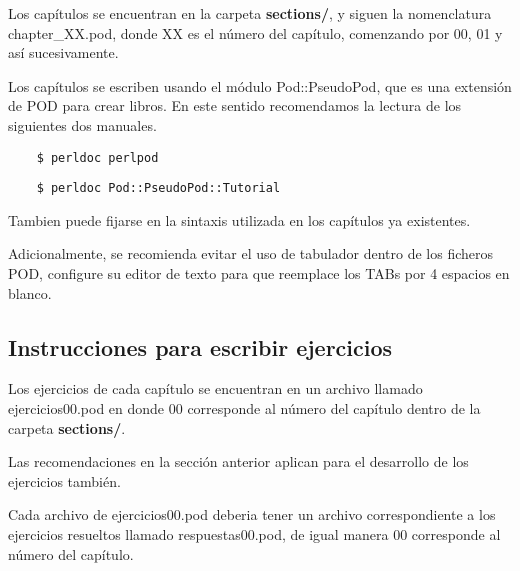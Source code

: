 \documentclass[spanish]{article}
\begin{document}
Los capítulos se encuentran en la carpeta \textbf{sections/}, y siguen la
nomenclatura chapter\_XX.pod, donde XX es el número del capítulo, comenzando por
00, 01 y así sucesivamente.



Los capítulos se escriben usando el módulo Pod::PseudoPod, que es una extensión
de POD para crear libros. En este sentido recomendamos la lectura de los
siguientes dos manuales.

\begin{verbatim}
    $ perldoc perlpod
\end{verbatim}
\begin{verbatim}
    $ perldoc Pod::PseudoPod::Tutorial
\end{verbatim}


Tambien puede fijarse en la sintaxis utilizada en los capítulos ya existentes.



Adicionalmente, se recomienda evitar el uso de tabulador dentro de los ficheros
POD, configure su editor de texto para que reemplace los TABs por 4 espacios en
blanco.

\subsection*{Instrucciones para escribir ejercicios\label{Instrucciones_para_escribir_ejercicios}}


Los ejercicios de cada capítulo se encuentran en un archivo llamado
ejercicios00.pod en donde 00 corresponde al número del capítulo dentro de la
carpeta \textbf{sections/}.



Las recomendaciones en la sección anterior aplican para el desarrollo de los
ejercicios también.



Cada archivo de ejercicios00.pod deberia tener un archivo correspondiente a los
ejercicios resueltos llamado respuestas00.pod, de igual manera 00 
corresponde al número del capítulo.
\end{document}

